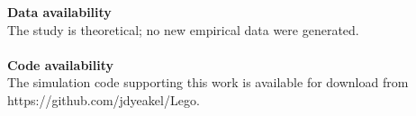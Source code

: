 \documentclass[twocolumn,preprintnumbers,amsmath,amssymb,superscriptaddress,linenumbers]{revtex4-1}
\begin{document}
\vspace{2mm}
\noindent \textbf{Data availability}\\
  \footnotesize{
  The study is theoretical; no new empirical data were generated.
  }\\ \\
\noindent \textbf{Code availability}\\
  \footnotesize{
  The simulation code supporting this work is available for download from https://github.com/jdyeakel/Lego.
  }\\



% 
% 
% 
% 
% 
% 
% 
% 
% 
% 
% 
\end{document}
